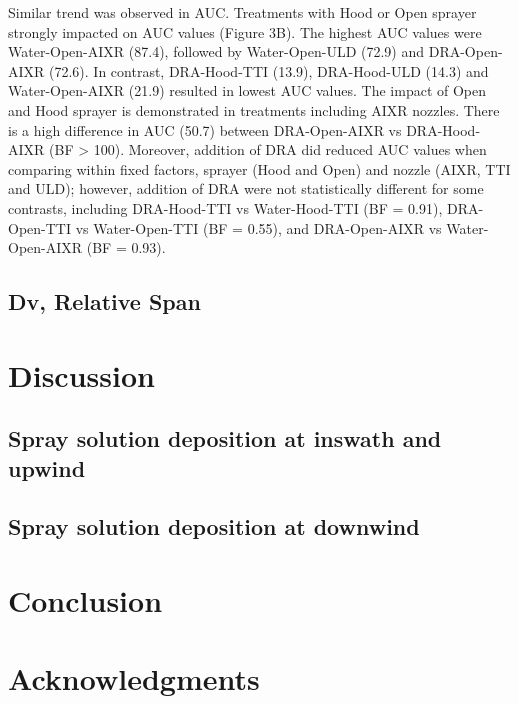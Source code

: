 \documentclass[
  12pt,
  a4paper,
]{article}
\begin{document}
Similar trend was observed in AUC. Treatments with Hood or Open sprayer
strongly impacted on AUC values (Figure 3B). The highest AUC values were
Water-Open-AIXR (87.4), followed by Water-Open-ULD (72.9) and
DRA-Open-AIXR (72.6). In contrast, DRA-Hood-TTI (13.9), DRA-Hood-ULD
(14.3) and Water-Open-AIXR (21.9) resulted in lowest AUC values. The
impact of Open and Hood sprayer is demonstrated in treatments including
AIXR nozzles. There is a high difference in AUC (50.7) between
DRA-Open-AIXR vs DRA-Hood-AIXR (BF \textgreater{} 100). Moreover,
addition of DRA did reduced AUC values when comparing within fixed
factors, sprayer (Hood and Open) and nozzle (AIXR, TTI and ULD);
however, addition of DRA were not statistically different for some
contrasts, including DRA-Hood-TTI vs Water-Hood-TTI (BF = 0.91),
DRA-Open-TTI vs Water-Open-TTI (BF = 0.55), and DRA-Open-AIXR vs
Water-Open-AIXR (BF = 0.93).

\hypertarget{dv-relative-span}{%
\subsection{Dv, Relative Span}\label{dv-relative-span}}

\hypertarget{discussion}{%
\section{Discussion}\label{discussion}}

\hypertarget{spray-solution-deposition-at-inswath-and-upwind-1}{%
\subsection{Spray solution deposition at inswath and
upwind}\label{spray-solution-deposition-at-inswath-and-upwind-1}}

\hypertarget{spray-solution-deposition-at-downwind-2}{%
\subsection{Spray solution deposition at
downwind}\label{spray-solution-deposition-at-downwind-2}}

\hypertarget{conclusion}{%
\section{Conclusion}\label{conclusion}}

\hypertarget{acknowledgments}{%
\section{Acknowledgments}\label{acknowledgments}}
\end{document}
